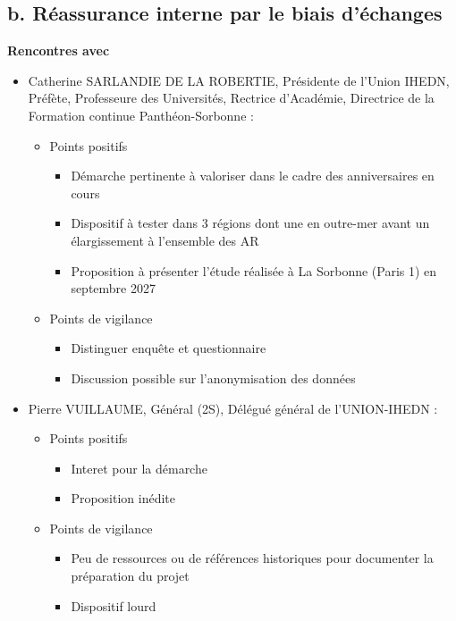 \documentclass[10pt,a4paper]{article}
\begin{document}
\subsection{b.	Réassurance interne par le biais d'échanges}

\textbf{Rencontres avec}

\begin{itemize}
    \item Catherine SARLANDIE DE LA ROBERTIE, Présidente de l'Union IHEDN, Préfète, Professeure des Universités, Rectrice d'Académie, Directrice de la Formation continue Panthéon-Sorbonne :
    \begin{itemize}
        \item Points positifs
        \begin{itemize}
            \item Démarche pertinente à valoriser dans le cadre des anniversaires en cours
            \item Dispositif à tester dans 3 régions dont une en outre-mer avant un élargissement à l'ensemble des AR
            \item Proposition à présenter l'étude réalisée à La Sorbonne (Paris 1) en septembre 2027
        \end{itemize}
        \item Points de vigilance
        \begin{itemize}
            \item Distinguer enquête et questionnaire
            \item Discussion possible sur l'anonymisation des données
        \end{itemize}
    \end{itemize}
    \item Pierre VUILLAUME, Général (2S), Délégué général de l'UNION-IHEDN :
    \begin{itemize}
        \item Points positifs
        \begin{itemize}
            \item Interet pour la démarche
            \item Proposition inédite
        \end{itemize}
        \item Points de vigilance
        \begin{itemize}
            \item Peu de ressources ou de références historiques pour documenter la préparation du projet
            \item Dispositif lourd
        \end{itemize}
    \end{itemize}
\end{itemize}
\end{document}
